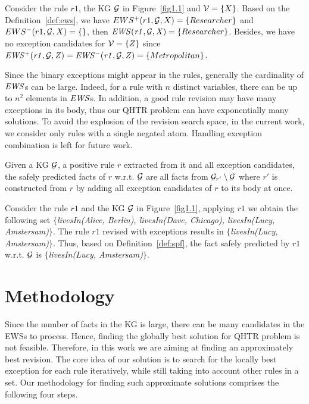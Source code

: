 \begin{example}
Consider the rule $r1$, the KG $\mathcal{G}$ in Figure~\ref{fig1.1} and $\mathcal{V} = \{X\}$. Based on the Definition~\ref{def:ews}, we have $EWS^+(r1,\mathcal{G},X) = \{Researcher\}$ and $EWS^-(r1,\mathcal{G},X) = \{\}$, then $\mathit{EWS(r1,\mathcal{G},X)}=\{Researcher\}$. Besides, we have no exception candidates for $\mathcal{V} = \{Z\}$ since $\mathit{EWS^+(r1,\mathcal{G},Z)} = \mathit{EWS^-(r1,\mathcal{G},Z)} = \{Metropolitan\}$.
\end{example}

Since the binary exceptions might appear in the rules, generally the cardinality of $\mathit{EWS}$s can be large. Indeed, for a rule with $n$ distinct variables, there can be up to $n^2$ elements in $\mathit{EWS}$s. In addition, a good rule revision may have many exceptions in its body, thus our QHTR problem can have exponentially many solutions. To avoid the explosion of the revision search space, in the current work, we consider only rules with a single negated atom. Handling exception combination is left for future work.

\begin{definition} \label{def:spf}
Given a KG $\mathcal{G}$, a positive rule $r$ extracted from it and all exception candidates, the safely predicted facts of $r$ w.r.t. $\mathcal{G}$ are all facts from $\mathcal{G}_{r'} \setminus \mathcal{G}$ where $r'$ is constructed from $r$ by adding all exception candidates of $r$ to its body at once.
\end{definition}

\begin{example}
Consider the rule $r1$ and the KG $\mathcal{G}$ in Figure~\ref{fig1.1}, applying $r1$ we obtain the following set \textit{$\{$livesIn(Alice, Berlin), livesIn(Dave, Chicago), livesIn(Lucy, Amstersam)$\}$}. The rule $r1$ revised with exceptions results in \textit{$\{$livesIn(Lucy, Amstersam)$\}$}. Thus, based on Definition~\ref{def:spf}, the fact safely predicted by $r1$ w.r.t. $\mathcal{G}$ is \textit{$\{$livesIn(Lucy, Amstersam)$\}$}.
\end{example}

\section{Methodology}\label{sec:meth}

Since the number of facts in the KG is large, there can be many candidates in the EWSs to process. Hence, finding the globally best solution for QHTR problem is not feasible. Therefore, in this work we are aiming at finding an approximately best revision. The core idea of our solution is to search for the locally best exception for each rule iteratively, while still taking into account other rules in a set. Our methodology for finding such approximate solutions comprises the following four steps.
\medskip

